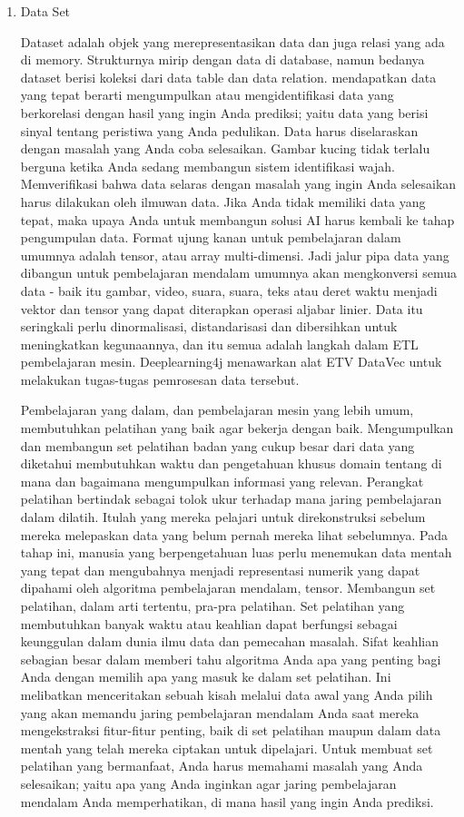 \begin{enumerate}
    \item{Data Set}
    \par Dataset adalah objek yang merepresentasikan data dan juga relasi yang ada di memory. Strukturnya mirip dengan data di database, namun bedanya dataset berisi koleksi dari data table dan data relation. mendapatkan data yang tepat berarti mengumpulkan atau mengidentifikasi data yang berkorelasi dengan hasil yang ingin Anda prediksi; yaitu data yang berisi sinyal tentang peristiwa yang Anda pedulikan. Data harus diselaraskan dengan masalah yang Anda coba selesaikan. Gambar kucing tidak terlalu berguna ketika Anda sedang membangun sistem identifikasi wajah. Memverifikasi bahwa data selaras dengan masalah yang ingin Anda selesaikan harus dilakukan oleh ilmuwan data. Jika Anda tidak memiliki data yang tepat, maka upaya Anda untuk membangun solusi AI harus kembali ke tahap pengumpulan data. Format ujung kanan untuk pembelajaran dalam umumnya adalah tensor, atau array multi-dimensi. Jadi jalur pipa data yang dibangun untuk pembelajaran mendalam umumnya akan mengkonversi semua data - baik itu gambar, video, suara, suara, teks atau deret waktu  menjadi vektor dan tensor yang dapat diterapkan operasi aljabar linier. Data itu seringkali perlu dinormalisasi, distandarisasi dan dibersihkan untuk meningkatkan kegunaannya, dan itu semua adalah langkah dalam ETL pembelajaran mesin. Deeplearning4j menawarkan alat ETV DataVec untuk melakukan tugas-tugas pemrosesan data tersebut.

    Pembelajaran yang dalam, dan pembelajaran mesin yang lebih umum, membutuhkan pelatihan yang baik agar bekerja dengan baik. Mengumpulkan dan membangun set pelatihan  badan yang cukup besar dari data yang diketahui  membutuhkan waktu dan pengetahuan khusus domain tentang di mana dan bagaimana mengumpulkan informasi yang relevan. Perangkat pelatihan bertindak sebagai tolok ukur terhadap mana jaring pembelajaran dalam dilatih. Itulah yang mereka pelajari untuk direkonstruksi sebelum mereka melepaskan data yang belum pernah mereka lihat sebelumnya. Pada tahap ini, manusia yang berpengetahuan luas perlu menemukan data mentah yang tepat dan mengubahnya menjadi representasi numerik yang dapat dipahami oleh algoritma pembelajaran mendalam, tensor. Membangun set pelatihan, dalam arti tertentu, pra-pra pelatihan. Set pelatihan yang membutuhkan banyak waktu atau keahlian dapat berfungsi sebagai keunggulan dalam dunia ilmu data dan pemecahan masalah. Sifat keahlian sebagian besar dalam memberi tahu algoritma Anda apa yang penting bagi Anda dengan memilih apa yang masuk ke dalam set pelatihan. Ini melibatkan menceritakan sebuah kisah  melalui data awal yang Anda pilih yang akan memandu jaring pembelajaran mendalam Anda saat mereka mengekstraksi fitur-fitur penting, baik di set pelatihan maupun dalam data mentah yang telah mereka ciptakan untuk dipelajari. Untuk membuat set pelatihan yang bermanfaat, Anda harus memahami masalah yang Anda selesaikan; yaitu apa yang Anda inginkan agar jaring pembelajaran mendalam Anda memperhatikan, di mana hasil yang ingin Anda prediksi.


\end{enumerate}
